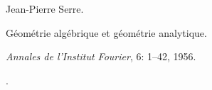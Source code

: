 Jean-Pierre Serre.

\newblock G\'eom\'etrie alg\'ebrique et g\'eom\'etrie analytique.

\newblock \emph{Annales de l'Institut Fourier}, 6: 1--42, 1956.

\newblock {}.

